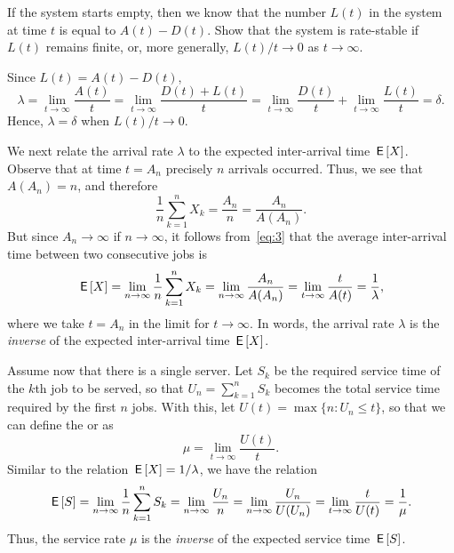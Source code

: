 \begin{exercise}
If the system starts empty, then we know that the number $L(t)$ in the system at time $t$ is equal to $A(t) - D(t)$.
Show that the system is rate-stable  if $L(t)$ remains finite, or, more generally, $L(t)/t \to 0$ as $t\to\infty$.
\begin{solution}
Since $L(t) = A(t) - D(t)$, 
\begin{equation*}
 \lambda = \lim_{t \to \infty} \frac{A(t)}t = \lim_{t \to \infty} \frac{D(t)+L(t)}t = \lim_{t \to \infty} \frac{D(t)}t + \lim_{t \to \infty} \frac{L(t)}t 
 = \delta. 
\end{equation*}
Hence, $\lambda=\delta$ when $L(t)/t\to0$.
\end{solution}
\end{exercise}


We next relate the arrival rate $\lambda$ to the expected inter-arrival time $\,\mathsf{E}\left[X\right]$.
Observe that at time $t=A_n$ precisely $n$ arrivals occurred.
Thus,
we see that $A(A_n) = n$, and therefore
\begin{equation*}
 \frac{1}n\sum_{k=1}^n X_k = \frac{A_n}n = \frac{A_n}{A(A_n)}. 
\end{equation*}
But since $A_n\to\infty$ if $n\to\infty$, it follows from~\cref{eq:3} that the average inter-arrival time between two consecutive jobs is
\begin{equation}\label{eq:54}
 \,\mathsf{E}\left[X\right] = \lim_{n\to\infty} \frac{1}n\sum_{k=1}^n X_k = \lim_{n\to \infty} \frac{A_n}{A(A_n)} = \lim_{t\to\infty} \frac t{A(t)} = \frac 1 \lambda,
\end{equation}
where we take $t=A_n$ in the limit for $t\to\infty$.
In words, the arrival rate $\lambda$ is the \emph{inverse} of the expected inter-arrival time $\,\mathsf{E}\left[X\right]$.


Assume now that there is a single server.
Let $S_k$ be the required service time of the $k$th job to be served, so that  $U_n = \sum_{k=1}^n S_k$ becomes the total service time required by the first $n$ jobs.
With this, let $ U(t) = \max\{n: U_n \leq t\}$, so that we can define the  or  as
\begin{equation*}
 \mu = \lim_{t\to\infty} \frac{U(t)}t.
\end{equation*}
Similar to the relation  $\,\mathsf{E}\left[X\right]= 1/\lambda$, we have the relation
\begin{equation*}
 \,\mathsf{E}\left[S\right] = \lim_{n\to\infty} \frac 1 n \sum_{k=1}^n S_k = \lim_{n\to\infty} \frac{U_n}{n} = \lim_{n\to\infty} \frac{U_n}{U(U_n)} = \lim_{t\to\infty} \frac t{U(t)} = \frac 1 \mu.
\end{equation*}
Thus,  the service rate $\mu$ is the \emph{inverse} of the expected service time $\,\mathsf{E}\left[S\right]$.

